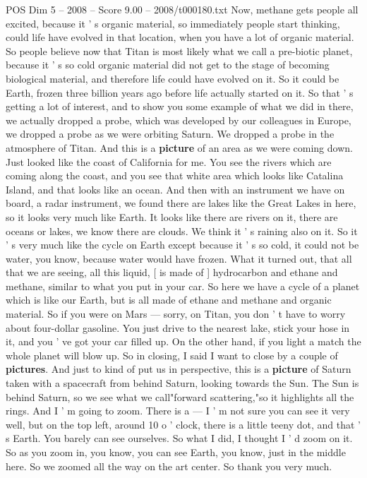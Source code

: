 \begin{textsample}{POS Dim 5 – 2008 – Score 9.00 – 2008/t000180.txt}
Now, methane gets people all excited, because it ' s organic material, so immediately people start thinking, could life have evolved in that location, when you have a lot of organic material.
So people believe now that Titan is most likely what we call a pre-biotic planet, because it ' s so cold organic material did not get to the stage of becoming biological material, and therefore life could have evolved on it.
So it could be Earth, frozen three billion years ago before life actually started on it.
So that ' s getting a lot of interest, and to show you some example of what we did in there, we actually dropped a probe, which was developed by our colleagues in Europe, we dropped a probe as we were orbiting Saturn.
We dropped a probe in the atmosphere of Titan.
And this is a \textbf{picture} of an area as we were coming down.
Just looked like the coast of California for me.
You see the rivers which are coming along the coast, and you see that white area which looks like Catalina Island, and that looks like an ocean.
And then with an instrument we have on board, a radar instrument, we found there are lakes like the Great Lakes in here, so it looks very much like Earth.
It looks like there are rivers on it, there are oceans or lakes, we know there are clouds.
We think it ' s raining also on it.
So it ' s very much like the cycle on Earth except because it ' s so cold, it could not be water, you know, because water would have frozen.
What it turned out, that all that we are seeing, all this liquid, [ is made of ] hydrocarbon and ethane and methane, similar to what you put in your car.
So here we have a cycle of a planet which is like our Earth, but is all made of ethane and methane and organic material.
So if you were on Mars — sorry, on Titan, you don ' t have to worry about four-dollar gasoline.
You just drive to the nearest lake, stick your hose in it, and you ' ve got your car filled up.
On the other hand, if you light a match the whole planet will blow up.
So in closing, I said I want to close by a couple of \textbf{pictures}.
And just to kind of put us in perspective, this is a \textbf{picture} of Saturn taken with a spacecraft from behind Saturn, looking towards the Sun.
The Sun is behind Saturn, so we see what we call"forward scattering,"so it highlights all the rings.
And I ' m going to zoom.
There is a — I ' m not sure you can see it very well, but on the top left, around 10 o ' clock, there is a little teeny dot, and that ' s Earth.
You barely can see ourselves.
So what I did, I thought I ' d zoom on it.
So as you zoom in, you know, you can see Earth, you know, just in the middle here.
So we zoomed all the way on the art center.
So thank you very much.

\end{textsample}
